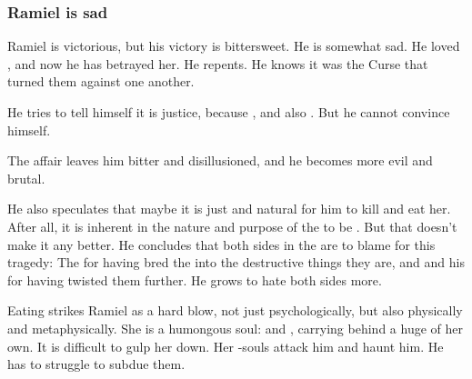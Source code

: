 \begin{garbage}
\subsubsection{Ramiel is sad}
Ramiel is victorious, but his victory is bittersweet. 
He is somewhat sad. 
He loved \Shiaraid, and now he has betrayed her. 
He repents. 
He knows it was the Curse that turned them against one another. 

He tries to tell himself it is justice, because \Delphine{} , and \Shiaraid{} also .
But he cannot convince himself. 

The affair leaves him bitter and disillusioned, and he becomes more evil and brutal. 

He also speculates that maybe it is just and natural for him to kill and eat her. 
After all, it is inherent in the nature and purpose of the \resphain{} to be . 
But that doesn't make it any better. 
He concludes that both sides in the  are to blame for this tragedy: 
The \banelords{} for having bred the \resphain{} into the destructive things they are, and \Nexagglachel{} and his \dragons{} for having twisted them further. 
He grows to hate both sides more. 


Eating \Shiaraid{} strikes Ramiel as a hard blow, not just psychologically, but also physically and metaphysically. 
She is a humongous soul: 
\Sathariah{} and \malach, carrying behind a huge \carcer{} of her own. 
It is difficult to gulp her down. 
Her \carcer-souls attack him and haunt him. 
He has to struggle to subdue them. 








\end{garbage}
